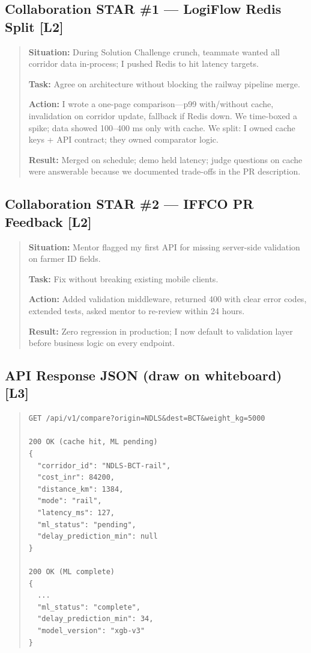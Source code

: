 \documentclass[9pt,a4paper]{article}
\newcommand{\diffLtwo}{\textcolor{orange!90!black}{\textbf{[L2]}}}
\newcommand{\diffLthree}{\textcolor{brutal}{\textbf{[L3]}}}
\begin{document}
\subsection{Collaboration STAR \#1 --- LogiFlow Redis Split \diffLtwo}
\begin{quote}\small
\textbf{Situation:} During Solution Challenge crunch, teammate wanted all corridor data in-process; I pushed Redis to hit latency targets.

\textbf{Task:} Agree on architecture without blocking the railway pipeline merge.

\textbf{Action:} I wrote a one-page comparison---p99 with/without cache, invalidation on corridor update, fallback if Redis down. We time-boxed a spike; data showed 100--400 ms only with cache. We split: I owned cache keys + API contract; they owned comparator logic.

\textbf{Result:} Merged on schedule; demo held latency; judge questions on cache were answerable because we documented trade-offs in the PR description.
\end{quote}

\subsection{Collaboration STAR \#2 --- IFFCO PR Feedback \diffLtwo}
\begin{quote}\small
\textbf{Situation:} Mentor flagged my first API for missing server-side validation on farmer ID fields.

\textbf{Task:} Fix without breaking existing mobile clients.

\textbf{Action:} Added validation middleware, returned 400 with clear error codes, extended tests, asked mentor to re-review within 24 hours.

\textbf{Result:} Zero regression in production; I now default to validation layer before business logic on every endpoint.
\end{quote}

\subsection{API Response JSON (draw on whiteboard) \diffLthree}
\begin{quote}\small
\begin{verbatim}
GET /api/v1/compare?origin=NDLS&dest=BCT&weight_kg=5000

200 OK (cache hit, ML pending)
{
  "corridor_id": "NDLS-BCT-rail",
  "cost_inr": 84200,
  "distance_km": 1384,
  "mode": "rail",
  "latency_ms": 127,
  "ml_status": "pending",
  "delay_prediction_min": null
}

200 OK (ML complete)
{
  ...
  "ml_status": "complete",
  "delay_prediction_min": 34,
  "model_version": "xgb-v3"
}
\end{verbatim}
\end{quote}
\end{document}

